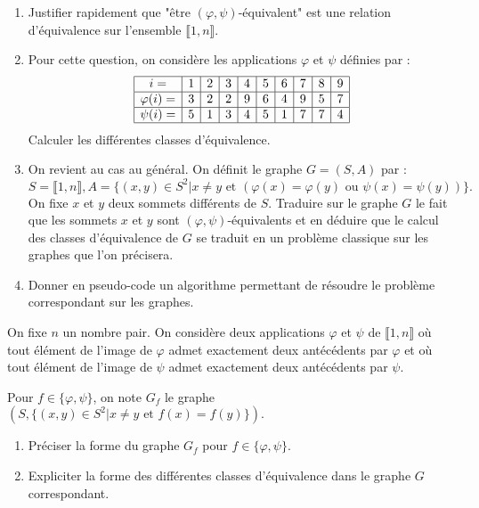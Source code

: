 \documentclass{ccinp}
\begin{document}
 \begin{enumerate}
     \item Justifier rapidement que "être $(\varphi,\psi)$-équivalent" est une relation d'équivalence sur l'ensemble $\llbracket 1,n \rrbracket$.
     \item Pour cette question, on considère les applications $\varphi$ et  $\psi$ définies par :
         \begin{equation*}
             \begin{array}{| c| l| l | l | l | l | l | l |  l | l | l |}
                 \hline  
                 i=  & 1 & 2 & 3 & 4 & 5 & 6 & 7 & 8 & 9 \\ 
                 \hline 
                 \varphi(i) =&   3 & 2 & 2 & 9 & 6 & 4 & 9 & 5 & 7 \\ 
                 \hline 
                 \psi(i) =&   5 & 1 & 3 & 4 & 5 & 1 & 7 & 7 & 4 \\ 
                 \hline 
             \end{array}
         \end{equation*}
         Calculer les différentes classes d'équivalence.
     \item On revient au cas au général. On définit le graphe $G =(S,A)$ par :
         $$ S = \llbracket 1, n \rrbracket , A = \{(x,y) \in S^2 | x\neq y \mbox{ et } (\varphi(x) = \varphi(y) \mbox{ ou } \psi(x) = \psi(y) ) \}.$$
         On fixe $x$ et  $y$ deux sommets différents de  $S$. Traduire sur le graphe $G$ le fait que les sommets $x$ et $y$ sont $(\varphi,\psi)$-équivalents et en déduire que le calcul des classes d'équivalence de  $G$ se traduit en un problème classique sur les graphes que l'on précisera. 
     \item Donner en pseudo-code un algorithme permettant de résoudre le problème correspondant
         sur les graphes. 
 \end{enumerate}
    On fixe $n$ un nombre pair. On considère deux applications $\varphi$ et  $\psi$
         de  $\llbracket 1,n \rrbracket$ où tout élément de l'image de $\varphi$ admet exactement 
         deux antécédents par  $\varphi$ et où tout élément de l'image de  $\psi$ admet exactement
         deux antécédents par  $\psi$.

         Pour $f\in \{\varphi, \psi\}$, on note  $G_f$ le graphe $(S, \{(x,y) \in S^2 | x\neq y \mbox{ et } f(x) = f(y) \}).$ 


         \begin{enumerate}[resume]
             \item Préciser la forme du graphe $G_f$ pour  $f\in \{\varphi,\psi\}$.  
             \item 
         Expliciter la forme des différentes classes d'équivalence dans le graphe $G$ correspondant.
         \end{enumerate}
\end{document}
